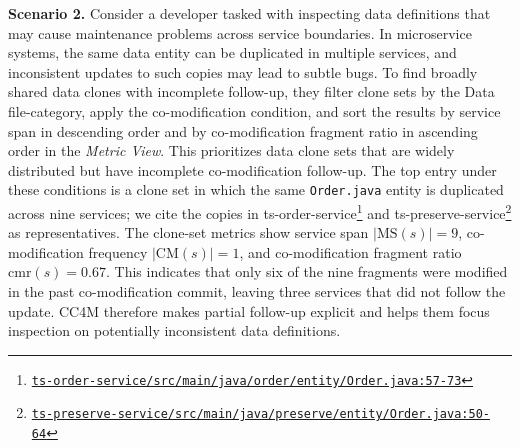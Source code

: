 \documentclass[conference]{IEEEtran}
\newcommand{\repo}{https://github.com/FudanSELab/train-ticket/blob/813dd01/}
\newcommand{\src}[2]{\href{\repo#1}{\nolinkurl{#2}}}
\begin{document}
\smallskip\noindent\textbf{Scenario 2.}
Consider a developer tasked with inspecting data definitions that may
cause maintenance problems across service boundaries. In microservice
systems, the same data entity can be duplicated in multiple services,
and inconsistent updates to such copies may lead to subtle bugs.
To find broadly shared data clones with incomplete follow-up, they
filter clone sets by the Data file-category, apply the co-modification
condition, and sort the results by service span in descending order and
by co-modification fragment ratio in ascending order in the
\emph{Metric View}.
This prioritizes data clone sets that are widely distributed but have
incomplete co-modification follow-up. The top entry under these
conditions is a clone set in
which the same \texttt{Order.java} entity is duplicated across nine
services; we cite the copies in
\mbox{ts-order-service}\footnote{\src{ts-order-service/src/main/java/order/entity/Order.java\#L57-L73}{ts-order-service/src/main/java/order/entity/Order.java:57-73}}
and
\mbox{ts-preserve-service}\footnote{\src{ts-preserve-service/src/main/java/preserve/entity/Order.java\#L50-L64}{ts-preserve-service/src/main/java/preserve/entity/Order.java:50-64}}
as representatives.
The clone-set metrics show service span $|\mathrm{MS}(s)| = 9$,
co-modification frequency $|\mathrm{CM}(s)| = 1$, and
co-modification fragment ratio $\mathrm{cmr}(s) = 0.67$. This indicates
that only six of the nine fragments were modified in the past
co-modification commit, leaving three services that did not follow the
update. \textsc{CC4M} therefore makes partial follow-up explicit and helps them
focus inspection on potentially inconsistent data definitions.
\end{document}
